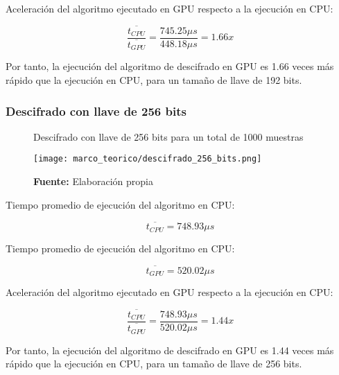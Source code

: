 \documentclass[../main/main.tex]{subfiles}
\begin{document}
        Aceleración del algoritmo ejecutado en GPU respecto a la ejecución en CPU:

        \vspace{-0.7cm}\begin{equation}
          \frac{\overline{t_{CPU}}}{\overline{t_{GPU}}} = \frac{745.25\mu s}{448.18\mu s} = 1.66x
        \end{equation}

        Por tanto, la ejecución del algoritmo de descifrado en GPU es 1.66 veces más rápido que la ejecución en CPU, para un tamaño de llave de 192 bits.

      \subsubsection{Descifrado con llave de 256 bits}

        \begin{figure}[H]
          \centering
          \caption{Descifrado con llave de 256 bits para un total de 1000 muestras}
          \texttt{[image: marco\_teorico/descifrado\_256\_bits.png]}
          \caption*{\textbf{Fuente:} Elaboración propia}
        \end{figure}

        Tiempo promedio de ejecución del algoritmo en CPU:

        \vspace{-0.7cm}\begin{equation}
          \overline{t_{CPU}} = 748.93\mu s
        \end{equation}

        Tiempo promedio de ejecución del algoritmo en CPU:

        \vspace{-0.7cm}\begin{equation}
          \overline{t_{GPU}} = 520.02\mu s
        \end{equation}

        Aceleración del algoritmo ejecutado en GPU respecto a la ejecución en CPU:

        \vspace{-0.7cm}\begin{equation}
          \frac{\overline{t_{CPU}}}{\overline{t_{GPU}}} = \frac{748.93\mu s}{520.02\mu s} = 1.44x
        \end{equation}

        Por tanto, la ejecución del algoritmo de descifrado en GPU es 1.44 veces más rápido que la ejecución en CPU, para un tamaño de llave de 256 bits.
\end{document}
